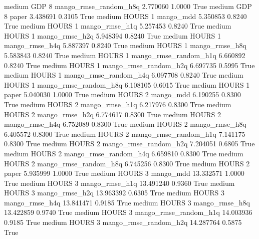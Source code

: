     medium      GDP                 8 mango_rmse_random_h8q   2.770060      1.0000    True
    medium      GDP                 8                 paper   3.438691      0.3105    True
    medium    HOURS                 1             mango_mdd   5.350853      0.8240    True
    medium    HOURS                 1        mango_rmse_h1q   5.257453      0.8240    True
    medium    HOURS                 1        mango_rmse_h2q   5.948394      0.8240    True
    medium    HOURS                 1        mango_rmse_h4q   5.887397      0.8240    True
    medium    HOURS                 1        mango_rmse_h8q   5.583843      0.8240    True
    medium    HOURS                 1 mango_rmse_random_h1q   6.660892      0.8240    True
    medium    HOURS                 1 mango_rmse_random_h2q   6.697735      0.5995    True
    medium    HOURS                 1 mango_rmse_random_h4q   6.097708      0.8240    True
    medium    HOURS                 1 mango_rmse_random_h8q   6.108105      0.6015    True
    medium    HOURS                 1                 paper   5.040030      1.0000    True
    medium    HOURS                 2             mango_mdd   6.190255      0.8300    True
    medium    HOURS                 2        mango_rmse_h1q   6.217976      0.8300    True
    medium    HOURS                 2        mango_rmse_h2q   6.774617      0.8300    True
    medium    HOURS                 2        mango_rmse_h4q   6.752089      0.8300    True
    medium    HOURS                 2        mango_rmse_h8q   6.405572      0.8300    True
    medium    HOURS                 2 mango_rmse_random_h1q   7.141175      0.8300    True
    medium    HOURS                 2 mango_rmse_random_h2q   7.204051      0.6805    True
    medium    HOURS                 2 mango_rmse_random_h4q   6.659810      0.8300    True
    medium    HOURS                 2 mango_rmse_random_h8q   6.745256      0.8300    True
    medium    HOURS                 2                 paper   5.935999      1.0000    True
    medium    HOURS                 3             mango_mdd  13.332571      1.0000    True
    medium    HOURS                 3        mango_rmse_h1q  13.491240      0.9360    True
    medium    HOURS                 3        mango_rmse_h2q  13.963392      0.6305    True
    medium    HOURS                 3        mango_rmse_h4q  13.841471      0.9185    True
    medium    HOURS                 3        mango_rmse_h8q  13.422859      0.9740    True
    medium    HOURS                 3 mango_rmse_random_h1q  14.003936      0.9185    True
    medium    HOURS                 3 mango_rmse_random_h2q  14.287764      0.5875    True
